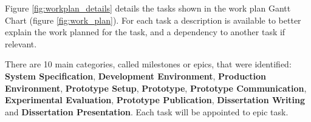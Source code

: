 Figure \ref{fig:workplan_details} details the tasks shown in the work plan Gantt Chart (figure \ref{fig:work_plan}). For each task a description is available to better explain the work planned for the task, and a dependency to another task if relevant.

There are 10 main categories, called milestones or epics, that were identified: \textbf{System Specification}, \textbf{Development Environment}, \textbf{Production Environment}, \textbf{Prototype Setup}, \textbf{Prototype}, \textbf{Prototype Communication}, \textbf{Experimental Evaluation}, \textbf{Prototype Publication}, \textbf{Dissertation Writing} and \textbf{Dissertation Presentation}. Each task will be appointed to epic task.